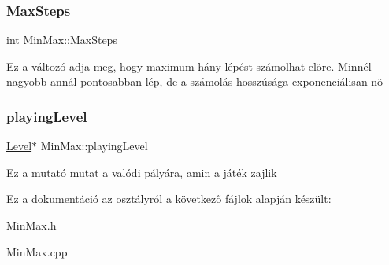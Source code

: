 \subsubsection{\texorpdfstring{Max\+Steps}{MaxSteps}}
{\footnotesize\ttfamily int Min\+Max\+::\+Max\+Steps\hspace{0.3cm}{\ttfamily [private]}}

Ez a változó adja meg, hogy maximum hány lépést számolhat elõre. Minnél nagyobb annál pontosabban lép, de a számolás hosszúsága exponenciálisan nõ \mbox{\label{class_min_max_a6972ddd2c6a41089c586220563e07e25}} 
\subsubsection{\texorpdfstring{playing\+Level}{playingLevel}}
{\footnotesize\ttfamily \hyperlink{class_level}{Level}$\ast$ Min\+Max\+::playing\+Level\hspace{0.3cm}{\ttfamily [private]}}

Ez a mutató mutat a valódi pályára, amin a játék zajlik 

Ez a dokumentáció az osztályról a következő fájlok alapján készült\+:\begin{DoxyCompactItemize}
\item 
Min\+Max.\+h\item 
Min\+Max.\+cpp\end{DoxyCompactItemize}
